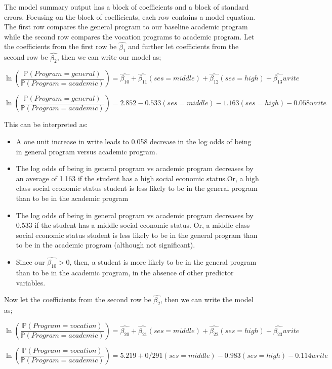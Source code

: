 \documentclass[
]{article}
\begin{document}
The model summary output has a block of coefficients and a block of
standard errors. Focusing on the block of coefficients, each row
contains a model equation. The first row compares the general program to
our baseline academic program while the second row compares the vocation
programs to academic program. Let the coefficients from the first row be
\(\hat{\beta_1}\) and further let coefficients from the second row be
\(\hat{\beta_2}\), then we can write our model as;

\[\ln(\frac{\mathbb{P}(Program=general)}{\mathbb{P}(Program=academic)})=\hat{\beta_{10}}+\hat{\beta_{11}}(ses=middle)+\hat{\beta_{12}}(ses=high)+\hat{\beta_{13}}write\]

\[\ln(\frac{\mathbb{P}(Program=general)}{\mathbb{P}(Program=academic)})=2.852-0.533(ses=middle)-1.163(ses=high)-0.058write\]

This can be interpreted as:

\begin{itemize}
\item
  A one unit increase in write leads to 0.058 decrease in the log odds
  of being in general program versus academic program.
\item
  The log odds of being in general program vs academic program decreases
  by an average of 1.163 if the student has a high social economic
  status.Or, a high class social economic status student is less likely
  to be in the general program than to be in the academic program
\item
  The log odds of being in general program vs academic program decreases
  by 0.533 if the student has a middle social economic status. Or, a
  middle class social economic status student is less likely to be in
  the general program than to be in the academic program (although not
  significant).
\item
  Since our \(\hat{\beta_{10}}>0\), then, a student is more likely to be
  in the general program than to be in the academic program, in the
  absence of other predictor variables.
\end{itemize}

Now let the coefficients from the second row be \(\hat{\beta_2}\), then
we can write the model as;

\[\ln(\frac{\mathbb{P}(Program=vocation)}{\mathbb{P}(Program=academic)})=\hat{\beta_{20}}+\hat{\beta_{21}}(ses=middle)+\hat{\beta_{22}}(ses=high)+\hat{\beta_{23}}write\]

\[\ln(\frac{\mathbb{P}(Program=vocation)}{\mathbb{P}(Program=academic)})=5.219+0/291(ses=middle)-0.983(ses=high)-0.114write\]
\end{document}
